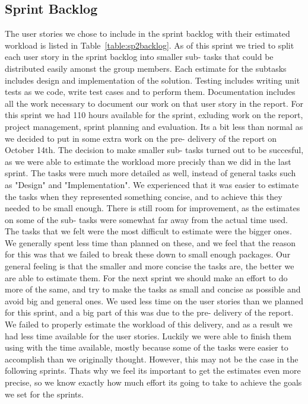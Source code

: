 \subsection{Sprint Backlog}
The user stories we chose to include in the sprint backlog with their estimated workload is listed in Table~\ref{table:sp2backlog}. As of this sprint we tried to split each user story in the sprint backlog into smaller sub- tasks that could be distributed easily amonst the group members. Each estimate for the subtasks includes design and implementation of the solution. Testing includes writing unit tests as we code, write test cases and to perform them. Documentation includes all the work necessary to document our work on that user story in the report. For this sprint we had 110 hours available for the sprint, exluding work on the report, project management, sprint planning and evaluation. Its a bit less than normal as we decided to put in some extra work on the pre- delivery of the report on October 14th.
\newline
\newline
The decision to make smaller sub- tasks turned out to be succesful, as we were able to estimate the workload more precisly than we did in the last sprint. The tasks were much more detailed as well, instead of general tasks such as "Design" and "Implementation". We experienced that it was easier to estimate the tasks when they represented something concise, and to achieve this they needed to be small enough.
\newline
\newline
There is still room for improvement, as the estimates on some of the sub- tasks were somewhat far away from the actual time used. The tasks that we felt were the most difficult to estimate were the bigger ones. We generally spent less time than planned on these, and we feel that the reason for this was that we failed to break these down to small enough packages. Our general feeling is that the smaller and more concise the tasks are, the better we are able to estimate them. For the next sprint we should make an effort to do more of the same, and try to make the tasks as small and concise as possible and avoid big and general ones.
\newline
\newline
We used less time on the user stories than we planned for this sprint, and a big part of this was due to the pre- delivery of the report. We failed to properly estimate the workload of this delivery, and as a result we had less time available for the user stories. Luckily we were able to finish them using with the time available, mostly because some of the tasks were easier to accomplish than we originally thought. However, this may not be the case in the following sprints. Thats why we feel its important to get the estimates even more precise, so we know exactly how much effort its going to take to achieve the goals we set for the sprints. 


